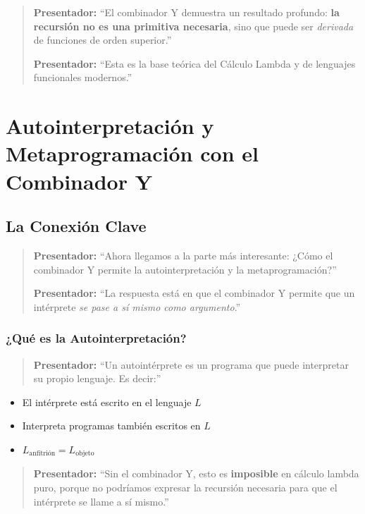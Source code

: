 \documentclass[12pt]{article}
\begin{document}
\begin{quote}
\textbf{Presentador:} ``El combinador Y demuestra un resultado profundo: \textbf{la recursión no es una primitiva necesaria}, sino que puede ser \textit{derivada} de funciones de orden superior.''

\textbf{Presentador:} ``Esta es la base teórica del Cálculo Lambda y de lenguajes funcionales modernos.''
\end{quote}

\newpage
\section*{Autointerpretación y Metaprogramación con el Combinador Y}

\subsection*{La Conexión Clave}

\begin{quote}
\textbf{Presentador:} ``Ahora llegamos a la parte más interesante: ¿Cómo el combinador Y permite la autointerpretación y la metaprogramación?''

\textbf{Presentador:} ``La respuesta está en que el combinador Y permite que un intérprete \textit{se pase a sí mismo como argumento}.''
\end{quote}

\subsubsection*{¿Qué es la Autointerpretación?}

\begin{quote}
\textbf{Presentador:} ``Un autointérprete es un programa que puede interpretar su propio lenguaje. Es decir:''
\end{quote}

\begin{itemize}
\item El intérprete está escrito en el lenguaje $L$
\item Interpreta programas también escritos en $L$
\item $L_{\text{anfitrión}} = L_{\text{objeto}}$
\end{itemize}

\begin{quote}
\textbf{Presentador:} ``Sin el combinador Y, esto es \textbf{imposible} en cálculo lambda puro, porque no podríamos expresar la recursión necesaria para que el intérprete se llame a sí mismo.''
\end{quote}
\end{document}
